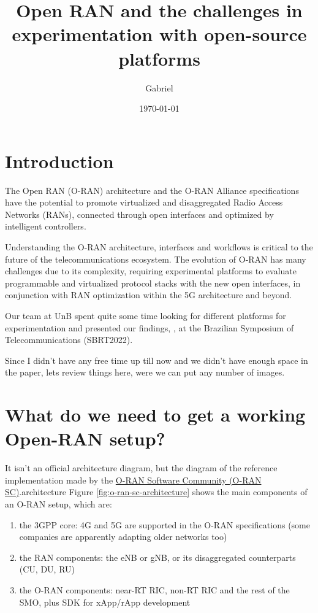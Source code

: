 \documentclass{article}
\title{Open RAN and the challenges in experimentation with open-source platforms}
\author{Gabriel}
\date{\today}
\begin{document}
\maketitle

\begin{abstract}
\end{abstract}

\section{Introduction}
    The Open RAN (O-RAN) architecture and the O-RAN Alliance specifications
    have the potential to promote virtualized and disaggregated Radio Access
    Networks (RANs), connected through open interfaces and optimized by
    intelligent controllers.

    Understanding the O-RAN architecture, interfaces and workflows is critical
    to the future of the telecommunications ecosystem. The evolution of O-RAN has
    many challenges due to its complexity, requiring experimental platforms to
    evaluate programmable and virtualized protocol stacks with the new open interfaces,
    in conjunction with RAN optimization within the 5G architecture and beyond.

    Our team at UnB spent quite some time looking for different platforms for
    experimentation and presented our findings, \cite{Solis_2022}, at the
    Brazilian Symposium of Telecommunications (SBRT2022).

    Since I didn't have any free time up till now and we didn't have enough space in the
    paper, lets review things here, were we can put any number of images.


\section{What do we need to get a working Open-RAN setup?}

    It isn't an official architecture diagram, but the diagram of the reference implementation
    made by the \href{https://wiki.o-ran-sc.org/display/OAM/OAM+Architecture#OAMArchitecture-IntegrationintoSMO}{O-RAN Software Community (O-RAN SC)}.architecture
    Figure \ref{fig:o-ran-sc-architecture} shows the main components of an O-RAN setup, which are:
    \begin{enumerate}
        \item the 3GPP core: 4G and 5G are supported in the O-RAN specifications (some companies are apparently adapting older networks too)
        \item the RAN components: the eNB or gNB, or its disaggregated counterparts (CU, DU, RU)
        \item the O-RAN components: near-RT RIC, non-RT RIC and the rest of the SMO, plus SDK for xApp/rApp development
    \end{enumerate}
\end{document}
